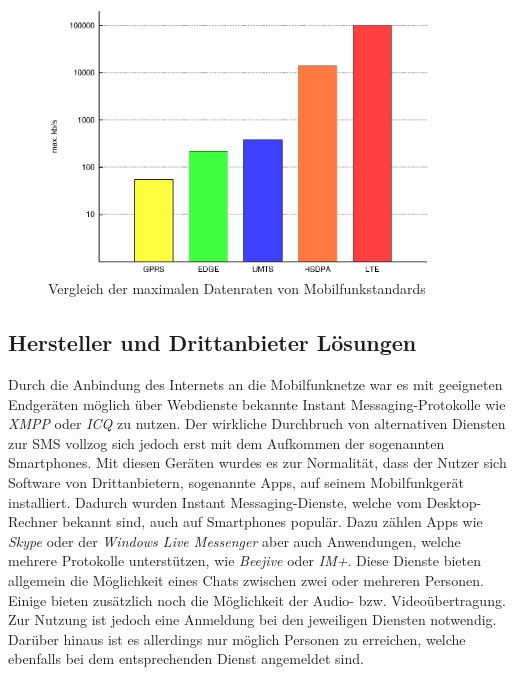 \documentclass[german,12pt,a4paper]{article}
\begin{document}
 \begin{figure}
     \centering
     \includegraphics[width=0.9\textwidth]{plot/datenraten}
     \caption{Vergleich der maximalen Datenraten von Mobilfunkstandards}

     \label{fig:datenraten}
 \end{figure}


 \subsection{Hersteller und Drittanbieter Lösungen} %
 \label{sub:drittanbieter}

 Durch die Anbindung des Internets an die Mobilfunknetze war es mit geeigneten Endgeräten möglich
 über Webdienste bekannte Instant Messaging-Protokolle wie \textit{XMPP} oder \textit{ICQ} zu
 nutzen. Der wirkliche Durchbruch von alternativen Diensten zur SMS vollzog sich jedoch erst mit dem
 Aufkommen der sogenannten \glqq{}Smartphones\grqq{}. Mit diesen Geräten wurdes es zur Normalität,
 dass der Nutzer sich Software von Drittanbietern, sogenannte \glqq{}Apps\grqq{}, auf seinem
 Mobilfunkgerät installiert. Dadurch wurden Instant Messaging-Dienste, welche vom Desktop-Rechner
 bekannt sind, auch auf Smartphones populär. Dazu zählen Apps wie \textit{Skype} oder der
 \textit{Windows Live Messenger} aber auch Anwendungen, welche mehrere Protokolle unterstützen, wie
 \textit{Beejive} oder \textit{IM+}. Diese Dienste bieten allgemein die Möglichkeit eines Chats
 zwischen zwei oder mehreren Personen. Einige bieten zusätzlich noch die Möglichkeit der Audio- bzw.
 Videoübertragung. Zur Nutzung ist jedoch eine Anmeldung bei den jeweiligen Diensten notwendig.
 Darüber hinaus ist es allerdings nur möglich Personen zu erreichen, welche ebenfalls bei dem
 entsprechenden Dienst angemeldet sind.
\end{document}
